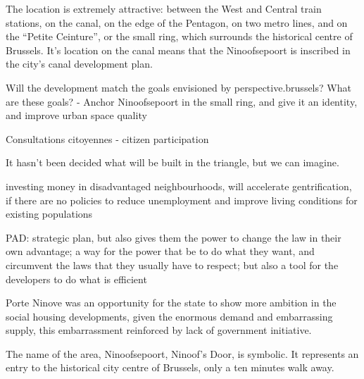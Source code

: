 \documentclass{article}
\begin{document}
The location is extremely attractive: between the West and Central train stations, on the canal, on the edge of the Pentagon, on two metro lines, and on the ``Petite Ceinture'', or the small ring, which surrounds the historical centre of Brussels. It's location on the canal means that the Ninoofsepoort is inscribed in the city's canal development plan.

Will the development match the goals envisioned by perspective.brussels?
What are these goals?
	- Anchor Ninoofsepoort in the small ring, and give it an identity, and improve urban space quality

Consultations citoyennes - citizen participation

It hasn't been decided what will be built in the triangle, but we can imagine.

investing money in disadvantaged neighbourhoods, will accelerate gentrification, if there are no policies to reduce unemployment and improve living conditions for existing populations

PAD: strategic plan, but also gives them the power to change the law in their own advantage; a way for the power that be to do what they want, and circumvent the laws that they usually have to respect; but also a tool for the developers to do what is efficient

Porte Ninove was an opportunity for the state to show more ambition in the social housing developments, given the enormous demand and embarrassing supply, this embarrassment reinforced by lack of government initiative.

The name of the area, Ninoofsepoort, Ninoof's Door, is symbolic. It represents an entry to the historical city centre of Brussels, only a ten minutes walk away. 
\end{document}
